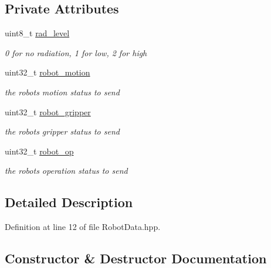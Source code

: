 \subsection*{Private Attributes}
\begin{DoxyCompactItemize}
\item 
uint8\+\_\+t \hyperlink{class_robot_data_ad41288ab1056c14560356bf1a3e0a652}{rad\+\_\+level}
\begin{DoxyCompactList}\small\item\em 0 for no radiation, 1 for low, 2 for high \end{DoxyCompactList}\item 
uint32\+\_\+t \hyperlink{class_robot_data_aaa03c73d21d0d28a8b1b3d384d777a1e}{robot\+\_\+motion}
\begin{DoxyCompactList}\small\item\em the robot\textquotesingle{}s motion status to send \end{DoxyCompactList}\item 
uint32\+\_\+t \hyperlink{class_robot_data_a83aa1b34c8785aa24e1fc358e50dfc26}{robot\+\_\+gripper}
\begin{DoxyCompactList}\small\item\em the robot\textquotesingle{}s gripper status to send \end{DoxyCompactList}\item 
uint32\+\_\+t \hyperlink{class_robot_data_aa8c48e89aac7db2af1db825a7f3c1f30}{robot\+\_\+op}
\begin{DoxyCompactList}\small\item\em the robot\textquotesingle{}s operation status to send \end{DoxyCompactList}\end{DoxyCompactItemize}


\subsection{Detailed Description}


Definition at line 12 of file Robot\+Data.\+hpp.



\subsection{Constructor \& Destructor Documentation}
\mbox{\label{class_robot_data_a0007f4b014a950d356d2d63156b572af}} 
